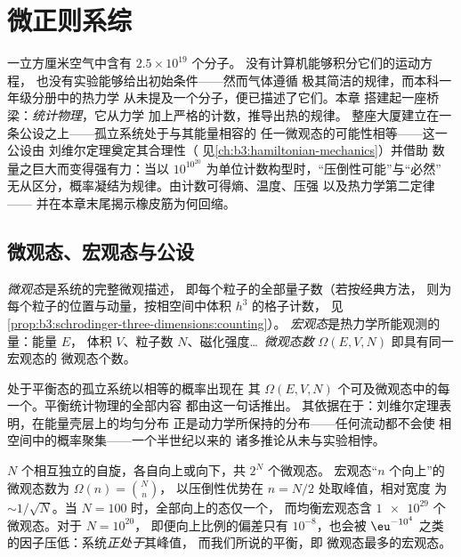 \chapter{微正则系综}\label{ch:b3:microcanonical-ensemble}

一立方厘米空气中含有 $2.5\times10^{19}$ 个分子。
没有计算机能够积分它们的运动方程，
也没有实验能够给出初始条件——然而气体遵循
极其简洁的规律，而本科一年级分册中的热力学
从未提及一个分子，便已描述了它们。本章
搭建起一座桥梁：\emph{统计物理}，它从力学
加上严格的计数，推导出热的规律。
整座大厦建立在一条公设之上——孤立系统处于与其能量相容的
任一微观态的可能性相等——这一公设由
刘维尔定理奠定其合理性（
见\cref{ch:b3:hamiltonian-mechanics}）并借助
数量之巨大而变得强有力：当以
$10^{10^{20}}$ 为单位计数构型时，“压倒性可能”与“必然”
无从区分，概率凝结为规律。由计数可得熵、温度、压强
以及热力学第二定律——
并在本章末尾揭示橡皮筋为何回缩。

\section{微观态、宏观态与公设}

\begin{definition}[微观态与宏观态]\label{def:b3:microcanonical-ensemble:states}
\emph{微观态}是系统的完整微观描述，
即每个粒子的全部量子数（若按经典方法，
则为每个粒子的位置与动量，按相空间中体积 $h^3$ 的格子计数，
见\cref{prop:b3:schrodinger-three-dimensions:counting}）。
\emph{宏观态}是热力学所能观测的量：能量 $E$，
体积 $V$、粒子数 $N$、磁化强度\dots\ 
\emph{微观态数} $\Omega(E, V, N)$ 即具有同一宏观态的
微观态个数。
\end{definition}

\begin{theorem}[基本公设]\label{thm:b3:microcanonical-ensemble:postulate}
\index{微正则系综}\index{基本公设}
处于平衡态的孤立系统以相等的概率出现在
其 $\Omega(E, V, N)$ 个可及微观态中的每一个。平衡统计物理的全部内容
都由这一句话推出。
其依据在于：刘维尔定理表明，在能量壳层上的均匀分布
正是动力学所保持的分布——任何流动都不会使
相空间中的概率聚集——一个半世纪以来的
诸多推论从未与实验相悖。
\end{theorem}
\admitted

\begin{example}[$N$ 枚硬币组成的磁铁]\label{ex:b3:microcanonical-ensemble:spins}
$N$ 个相互独立的自旋，各自向上或向下，共 $2^N$ 个微观态。
宏观态“$n$ 个向上”的微观态数为 $\Omega(n) = \binom Nn$，
以压倒性优势在 $n = N/2$ 处取峰值，相对宽度
为 $\sim1/\sqrt N$。当 $N = 100$ 时，全部向上的态仅一个，
而均衡宏观态含 $\num{1e29}$ 个微观态。对于 $N = 10^{20}$，
即便向上比例的偏差只有 $10^{-8}$，也会被
$\eu^{-10^4}$ 之类的因子压低：系统\emph{正处于}其峰值，
而我们所说的平衡，即
微观态最多的宏观态。
\end{example}

